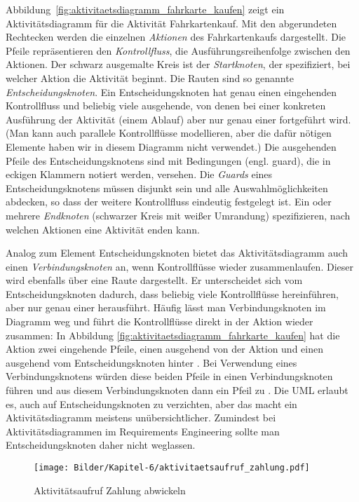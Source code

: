 Abbildung~\ref{fig:aktivitaetsdiagramm_fahrkarte_kaufen} zeigt ein Aktivitätsdiagramm für die Aktivität Fahrkartenkauf. Mit den abgerundeten Rechtecken werden die einzelnen \textit{Aktionen} des Fahrkartenkaufs dargestellt. Die Pfeile repräsentieren den \textit{Kontrollfluss}, die Ausführungsreihenfolge zwischen den Aktionen. Der schwarz ausgemalte Kreis ist der \textit{Startknoten}, der spezifiziert, bei welcher Aktion die Aktivität beginnt. Die Rauten sind so genannte \textit{Entscheidungsknoten}. Ein Entscheidungsknoten hat genau einen eingehenden Kontrollfluss und beliebig viele ausgehende, von denen bei einer konkreten Ausführung der Aktivität (einem Ablauf) aber nur genau einer fortgeführt wird. (Man kann auch parallele Kontrollflüsse modellieren, aber die dafür nötigen Elemente haben wir in diesem Diagramm nicht verwendet.) Die ausgehenden Pfeile des Entscheidungsknotens sind mit Bedingungen (engl. guard), die in eckigen Klammern notiert werden, versehen. Die \textit{Guards} eines Entscheidungsknotens müssen disjunkt sein und alle Auswahlmöglichkeiten abdecken, so dass der weitere Kontrollfluss eindeutig festgelegt ist. Ein oder mehrere \textit{Endknoten} (schwarzer Kreis mit weißer Umrandung) spezifizieren, nach welchen Aktionen eine Aktivität enden kann.

Analog zum Element Entscheidungsknoten bietet das Aktivitätsdiagramm auch einen \textit{Verbindungsknoten} an, wenn Kontrollflüsse wieder zusammenlaufen. Dieser wird ebenfalls über eine Raute dargestellt. Er unterscheidet sich vom Entscheidungsknoten dadurch, dass beliebig viele Kontrollflüsse hereinführen, aber nur genau einer herausführt. Häufig lässt man Verbindungsknoten im Diagramm weg und führt die Kontrollflüsse direkt in der Aktion wieder zusammen: In Abbildung \ref{fig:aktivitaetsdiagramm_fahrkarte_kaufen} hat die Aktion  zwei eingehende Pfeile, einen ausgehend von der Aktion   und einen ausgehend vom Entscheidungsknoten hinter . Bei Verwendung eines Verbindungsknotens würden diese beiden Pfeile in einen Verbindungsknoten führen und aus diesem Verbindungsknoten dann ein Pfeil zu  . Die UML erlaubt es, auch auf Entscheidungsknoten zu verzichten, aber das macht ein Aktivitätsdiagramm meistens unübersichtlicher. Zumindest bei Aktivitätsdiagrammen im Requirements Engineering sollte man Entscheidungsknoten daher nicht weglassen.

\begin{figure}[h!]
	\centering
	\texttt{[image: Bilder/Kapitel-6/aktivitaetsaufruf\_zahlung.pdf]}
	\caption{Aktivitätsaufruf Zahlung abwickeln}
	\label{fig:aktivitaetsaufruf_zahlung}
\end{figure}

